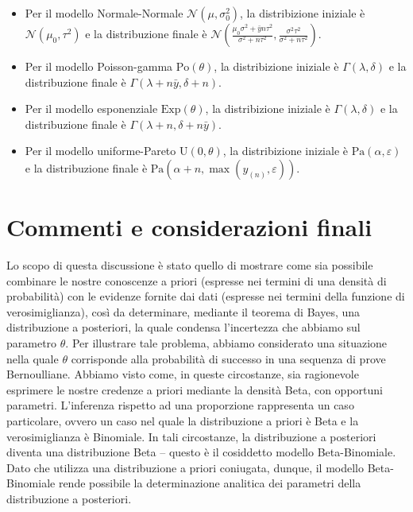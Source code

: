 \documentclass[
  11pt,
]{krantz}
\providecommand{\tightlist}{%
  \setlength{\itemsep}{0pt}\setlength{\parskip}{0pt}}
\theoremstyle{definition}
\theoremstyle{definition}
\theoremstyle{definition}
\theoremstyle{definition}
\theoremstyle{remark}
\begin{document}
\begin{itemize}
\tightlist
\item
  Per il modello Normale-Normale \(\mathcal{N}(\mu, \sigma^2_0)\), la distribizione iniziale è \(\mathcal{N}(\mu_0, \tau^2)\) e la distribuzione finale è \(\mathcal{N}\left(\frac{\mu_0\sigma^2 + \bar{y}n\tau^2}{\sigma^2 + n\tau^2}, \frac{\sigma^2\tau^2}{\sigma^2 + n\tau^2} \right)\).
\item
  Per il modello Poisson-gamma \(\text{Po}(\theta)\), la distribizione iniziale è \(\Gamma(\lambda, \delta)\) e la distribuzione finale è \(\Gamma(\lambda + n \bar{y}, \delta +n)\).
\item
  Per il modello esponenziale \(\text{Exp}(\theta)\), la distribizione iniziale è \(\Gamma(\lambda, \delta)\) e la distribuzione finale è \(\Gamma(\lambda + n, \delta +n\bar{y})\).
\item
  Per il modello uniforme-Pareto \(\text{U}(0, \theta)\), la distribizione iniziale è \(\mbox{Pa}(\alpha, \varepsilon)\) e la distribuzione finale è \(\mbox{Pa}(\alpha + n, \max(y_{(n)}, \varepsilon))\).
\end{itemize}

\hypertarget{commenti-e-considerazioni-finali-1}{%
\section*{Commenti e considerazioni finali}\label{commenti-e-considerazioni-finali-1}}


Lo scopo di questa discussione è stato quello di mostrare come sia possibile combinare le nostre conoscenze a priori (espresse nei termini di una densità di probabilità) con le evidenze fornite dai dati (espresse nei termini della funzione di verosimiglianza), così da determinare, mediante il teorema di Bayes, una distribuzione a posteriori, la quale condensa l'incertezza che abbiamo sul parametro \(\theta\). Per illustrare tale problema, abbiamo considerato una situazione nella quale \(\theta\) corrisponde alla probabilità di successo in una sequenza di prove Bernoulliane. Abbiamo visto come, in queste circostanze, sia ragionevole esprimere le nostre credenze a priori mediante la densità Beta, con opportuni parametri. L'inferenza rispetto ad una proporzione rappresenta un caso particolare, ovvero un caso nel quale la distribuzione a priori è Beta e la verosimiglianza è Binomiale. In tali circostanze, la distribuzione a posteriori diventa una distribuzione Beta -- questo è il cosiddetto modello Beta-Binomiale. Dato che utilizza una distribuzione a priori coniugata, dunque, il modello Beta-Binomiale rende possibile la determinazione analitica dei parametri della distribuzione a posteriori.
\end{document}
